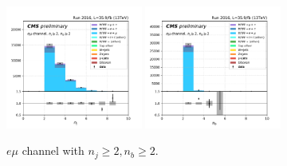 \begin{figure}[ht]
    \includegraphics[width=0.4\textwidth]{chapters/Analysis/sectionPlots/figures/kinematics_pickles/emu2/2b/emu2_2b_nJets.pdf}
    \includegraphics[width=0.4\textwidth]{chapters/Analysis/sectionPlots/figures/kinematics_pickles/emu2/2b/emu2_2b_nBJets.pdf}
    
    \caption{$e\mu$ channel with $n_j\geq2, n_b\geq2$.}
\end{figure}


